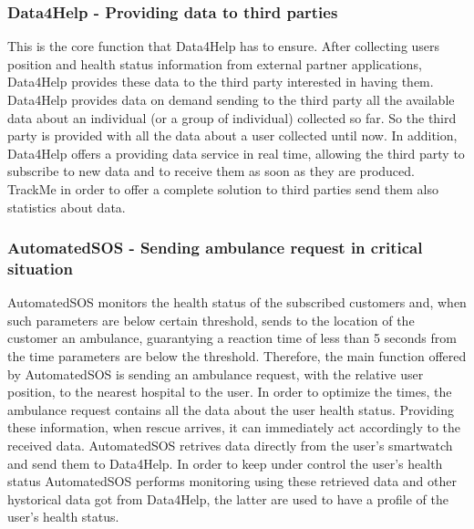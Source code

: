 \subsubsection{Data4Help - Providing data to third parties }
This is the core function that Data4Help has to ensure. After collecting users position and health status information from external partner applications, Data4Help provides these data to the third party interested in having them. Data4Help provides data on demand sending to the third party all the available data about an individual (or a group of individual) collected so far. So the third party is provided with all the data about a user collected until now. In addition, Data4Help offers a providing data service in real time, allowing the third party to subscribe to new data and to receive them as soon as they are produced. TrackMe in order to offer a complete solution to third parties send them also statistics about data.

\subsubsection{AutomatedSOS - Sending ambulance request in critical situation}
AutomatedSOS monitors the health status of the subscribed customers and, when such parameters are below certain threshold, sends to the location of the customer an ambulance, guarantying a reaction time of less than 5 seconds from the time parameters are below the threshold.
\bigbreak
\noindent
Therefore, the main function offered by AutomatedSOS is sending an ambulance request, with the relative user position, to the nearest hospital to the user. In order to optimize the times, the ambulance request contains all the data about the user health status. Providing these information, when rescue arrives, it can immediately act accordingly to the received data. AutomatedSOS retrives data directly from the user's smartwatch and send them to Data4Help. In order to keep under control the user's health status AutomatedSOS performs monitoring using these retrieved data and other hystorical data got from Data4Help, the latter are used to have a profile of the user's health status.
